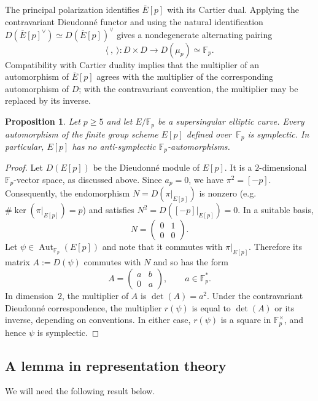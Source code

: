 \documentclass[12pt]{amsart}
\numberwithin{equation}{section}
\newtheorem{prop}[equation]{Proposition}
\theoremstyle{definition}
\newcommand{\F}{\mathbb{F}}
\DeclareMathOperator{\Aut}{Aut}
\begin{document}
The principal polarization identifies $\overline E[p]$ with its
Cartier dual. Applying the contravariant Dieudonn\'e functor and
using the natural identification
\(
 D(\overline E[p]^\vee)\simeq D(\overline E[p])^\vee
\)
gives a nondegenerate alternating pairing
\begin{equation}\label{eq:l=ppair}
 \langle\ ,\ \rangle:D\times D\longrightarrow D(\mu_p)\simeq\F_p.
\end{equation}
Compatibility with Cartier
duality implies that the multiplier of an
automorphism of $\overline E[p]$ agrees with the
multiplier of the corresponding automorphism of $D$; with the
contravariant convention, the multiplier may be replaced by its
inverse.

\begin{prop}\label{prop:ss-automorphism}
Let $p\geq5$ and let $ E/\F_p$ be a supersingular elliptic curve.
Every automorphism of the finite group scheme $ E[p]$ defined
over~$\F_p$ is symplectic.  In particular, $ E[p]$ has no
anti-symplectic $\F_p$-automorphisms.
\end{prop}

\begin{proof}
Let $D( E[p])$
be the Dieudonn\'e module of $ E[p]$.  It is a $2$-dimensional
$\F_p$-vector space, as discussed above. Since $a_p=0$, we have
$\pi^2=[-p]$.  Consequently, the endomorphism $N=D(\pi|_{E[p]})$ is nonzero (e.g. $\#\ker(\pi|_{E[p]})=p$) and
satisfies $N^2=D([-p]|_{E[p]})=0$.  In a suitable basis,
\[
 N=\begin{pmatrix}0&1\\0&0\end{pmatrix}.
\]
Let $\psi \in \Aut_{\F_p}(E[p])$ and note that it commutes with $\pi|_{E[p]}$. Therefore its matrix $A:=D(\psi)$ commutes with $N$ and so has the form
\[
 A=\begin{pmatrix}a&b\\0&a\end{pmatrix},
 \qquad a\in\F_p^*.
\]
In dimension~$2$, the multiplier of $A$ is
$\det(A)=a^2$.
Under the contravariant Dieudonn\'e correspondence, the multiplier
$r(\psi)$ is equal to $\det(A)$ or its inverse, depending on conventions.
In either case, $r(\psi)$ is a square in $\F_p^\times$, and hence
$\psi$ is symplectic.
\end{proof}

\subsection{A lemma in representation theory} We will need the following result below.
\end{document}
